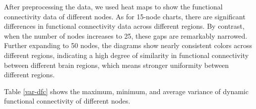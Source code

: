 \documentclass[11pt]{article}
\begin{document}
After preprocessing the data, we used heat maps to show the functional connectivity data of different nodes. As for 15-node charts, there are significant differences in functional connectivity data across different regions. By contrast, when the number of nodes increases to 25, these gaps are remarkably narrowed. Further expanding to 50 nodes, the diagrams show nearly consistent colors across different regions, indicating a high degree of similarity in functional connectivity between different brain regions, which means stronger uniformity between different regions.

Table \ref{var-dfc} shows the maximum, minimum, and average variance of dynamic functional connectivity of different nodes.

\begin{figure}[H]
    \centering
     \\

\end{figure}
\end{document}
